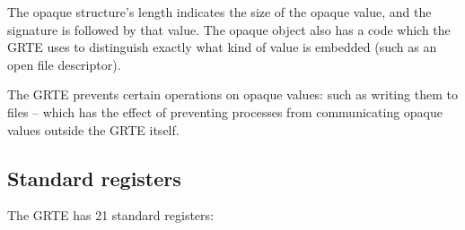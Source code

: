\begin{description}
The opaque structure's length indicates the size of the opaque value, and the signature is followed by that value. The opaque object also has a code which the GRTE uses to distinguish exactly what kind of value is embedded (such as an open file descriptor).

The GRTE prevents certain operations on opaque values: such as writing them to files -- which has the effect of preventing processes from communicating opaque values outside the GRTE itself.
\end{description}

\subsection{Standard registers}
\label{howitworks:registers}

The GRTE has 21 standard registers:
